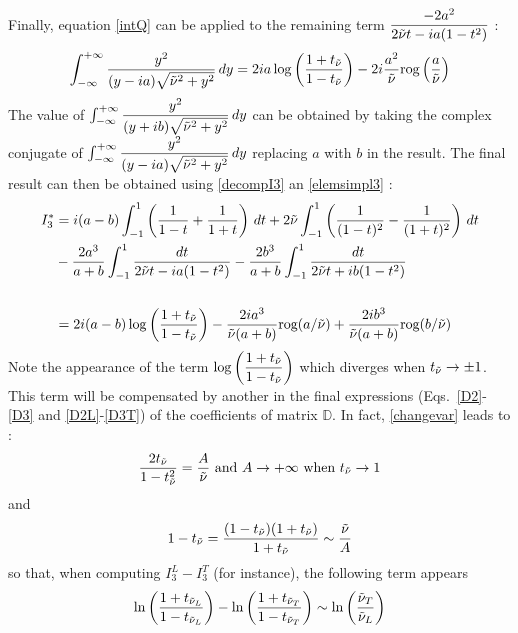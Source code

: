 Finally, equation \eqref{intQ} can be applied to the remaining term $\dfrac{-2a^2}{2\tilde{\nu} t-ia(1-t^2)}$ :
\begin{equation}
\int_{-\infty}^{+\infty} \frac{y^2}{(y-ia)\sqrt{\tilde{\nu}^2+y^2}} \, dy =2ia\log\left(\frac{1+t_{\tilde{\nu}}}{1-t_{\tilde{\nu}}}\right)-2i\frac{a^2}{\tilde{\nu}}\mbox{rog}\left(\frac{a}{\tilde{\nu}}\right)
\label{y2_D}
\end{equation}
The value of $\int_{-\infty}^{+\infty} \dfrac{y^2}{(y+ib)\sqrt{\tilde{\nu}^2+y^2}} \, dy $ can be obtained by taking the complex conjugate of  $\int_{-\infty}^{+\infty} \dfrac{y^2}{(y-ia)\sqrt{\tilde{\nu}^2+y^2}} \, dy $ replacing $a$ with $b$ in the result. The final result can then be obtained using \eqref{decompI3} an \eqref{elemsimpl3} :
\begin{equation}
\begin{split}
I_3^*&=i(a-b)\int_{-1}^1 \left( \frac{1}{1-t}+\frac{1}{1+t} \right) \, dt+ 2\tilde{\nu} \int_{-1}^1 \left( \frac{1}{(1-t)^2}-\frac{1}{(1+t)^2} \right) \, dt \\
 &-\frac{2a^3}{a+b}\int_{-1}^1\frac{dt}{2\tilde{\nu} t-ia(1-t^2)}-\frac{2b^3}{a+b}\int_{-1}^1\frac{dt}{2\tilde{\nu} t+ib(1-t^2)}\\
 ~\\
 &=2i(a-b)\log\left(\frac{1+t_{\tilde{\nu}}}{1-t_{\tilde{\nu}}}\right)-\frac{2ia^3}{\tilde{\nu}(a+b)}\mbox{rog}(a/\tilde{\nu})+\frac{2ib^3}{\tilde{\nu}(a+b)}\mbox{rog}(b/\tilde{\nu}) 
\end{split}
\label{valI3}
\end{equation}
Note the appearance of the term $\log\left(\dfrac{1+t_{\tilde{\nu}}}{1-t_{\tilde{\nu}}}\right)$ which diverges when $t_{\tilde{\nu}} \to \pm 1$. This term will be compensated by another in the final expressions (Eqs.~\eqref{D2}-\eqref{D3} and \eqref{D2L}-\eqref{D3T}) of the coefficients of matrix $\mathbb{D}$. In fact, \eqref{changevar} leads to :
\begin{equation}
\frac{2t_{\tilde{\nu}}}{1-t_{\tilde{\nu}}^2}=\frac{A}{\tilde{\nu}} \mbox{ and } A\rightarrow + \infty \mbox{ when } t_{\tilde{\nu}} \rightarrow 1
\end{equation}
and
\begin{equation}
1-t_{\tilde{\nu}} =\frac{(1-t_{\tilde{\nu}})(1+t_{\tilde{\nu}})}{1+t_{\tilde{\nu}}} \sim \frac{\tilde{\nu}}{A}
\end{equation}
so that, when computing $I_3^L-I_3^T$ (for instance), the following term appears
\begin{equation}
\ln\left(\frac{1+t_{\tilde{\nu}_L}}{1-t_{\tilde{\nu}_L}}\right)- \ln\left(\frac{1+t_{\tilde{\nu}_T}}{1-t_{\tilde{\nu}_T}}\right)\sim \ln\left(\frac{\tilde{\nu}_T}{\tilde{\nu}_L}\right) 
\label{compensation}
\end{equation}

